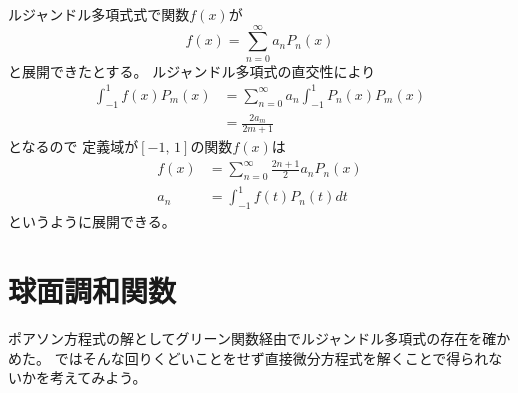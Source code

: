 \documentclass[../../master.tex]{subfiles}
\begin{document}
ルジャンドル多項式式で関数\(f(x)\)が
\begin{equation}
	f(x) = \sum_{n=0}^{\infty} a_n P_n(x)
\end{equation}
と展開できたとする。
ルジャンドル多項式の直交性により
\begin{align}
	\int_{-1}^{1}f(x) P_m(x) & = \sum_{n=0}^{\infty} a_n \int_{-1}^{1} P_n(x) P_m(x) \\
	                         & = \frac{2a_m}{2m+1}
\end{align}
となるので
定義域が\([-1,\,1]\)の関数\(f(x)\)は
\begin{align}
	f(x) & = \sum_{n=0}^{\infty} \frac{2n+1}{2}a_n P_n(x) \\
	a_n  & =\int_{-1}^{1}f(t)P_n(t) dt
\end{align}
というように展開できる。

\section{球面調和関数}
ポアソン方程式の解としてグリーン関数経由でルジャンドル多項式の存在を確かめた。
ではそんな回りくどいことをせず直接微分方程式を解くことで得られないかを考えてみよう。
\end{document}
